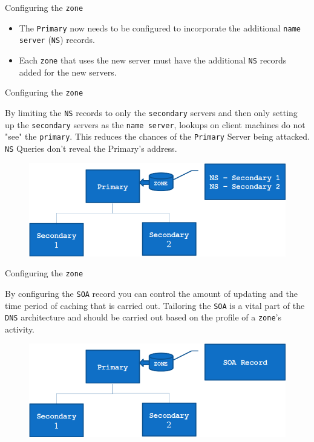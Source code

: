 \documentclass[xcolor=table]{beamer}
\begin{document}
\begin{frame}{Configuring the \texttt{zone}}
  \begin{itemize}
    \item The \texttt{Primary} now needs to be configured to incorporate the additional \texttt{name server} (\texttt{NS}) records.
    \item Each \texttt{zone} that uses the new server must have the additional \texttt{NS} records added for the new servers.
  \end{itemize}
\end{frame}

\begin{frame}{Configuring the \texttt{zone}}
  \begin{tcolorbox}[title={\textbf{SECURITY:}}]
      By limiting the \texttt{NS} records to only the \texttt{secondary} servers and then only setting up the \texttt{secondary} servers as the \texttt{name server}, lookups on client machines do not "see" the \texttt{primary}. This reduces the chances of the \texttt{Primary} Server being attacked. \texttt{NS} Queries don't reveal the Primary's address.
  \end{tcolorbox}
  \begin{figure}
    \begin{center}
      \includegraphics[width=.7\linewidth]{Secondary.png}
    \end{center}
  \end{figure}
\end{frame}

\begin{frame}{Configuring the \texttt{zone}}
  \begin{tcolorbox}[title={\textbf{PERFORMANCE:}}]
    By configuring the \texttt{SOA} record you can control the amount of updating and the time period of caching that is carried out. Tailoring the \texttt{SOA} is a vital part of the \texttt{DNS} architecture and should be carried out based on the profile of a \texttt{zone}'s activity.
  \end{tcolorbox}
  \begin{figure}
    \begin{center}
      \includegraphics[width=.7\linewidth]{Secondary2.png}
    \end{center}
  \end{figure}
\end{frame}
\end{document}
